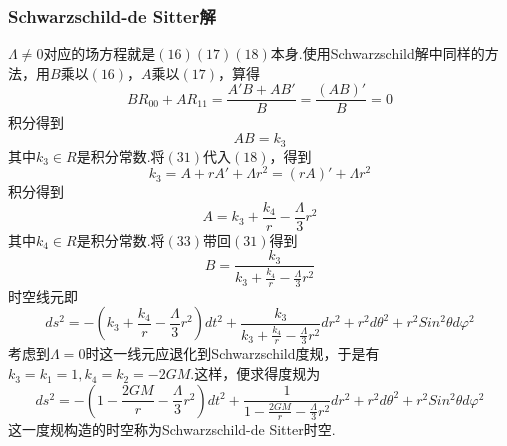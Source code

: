 	
	
	\subsubsection{Schwarzschild-de Sitter解}
	
	
	
	$\Lambda\ne0$对应的场方程就是$(16)(17)(18)$本身.使用Schwarzschild解中同样的方法，用$B$乘以$(16)$，$A$乘以$(17)$，算得
	\begin{equation}
		  BR_{00}+AR_{11}=\frac{A'B+AB'}{B}=\frac{(AB)'}{B}=0
	\end{equation}
	积分得到
	\begin{equation}
		  AB=k_3
	\end{equation}
	其中$k_3\in R$是积分常数.将$(31)$代入$(18)$，得到
	\begin{equation}
		  k_3=A+rA'+\Lambda r^2=(rA)'+\Lambda r^2
	\end{equation}
	积分得到
	\begin{equation}
		  A=k_3+\frac{k_4}{r}-\frac{\Lambda}{3}r^2
	\end{equation}
	其中$k_4\in R$是积分常数.将$(33)$带回$(31)$得到
	\begin{equation}
		  B=\frac{k_3}{k_3+\frac{k_4}{r}-\frac{\Lambda}{3}r^2}
	\end{equation}
	时空线元即
	\begin{equation}
		  ds^2=-\left(k_3+\frac{k_4}{r}-\frac{\Lambda}{3}r^2\right)dt^2+\frac{k_3}{k_3+\frac{k_4}{r}-\frac{\Lambda}{3}r^2}dr^2+r^2d\theta^2+r^2Sin^2\theta d\varphi^2
	\end{equation}
	考虑到$\Lambda=0$时这一线元应退化到Schwarzschild度规，于是有$k_3=k_1=1,k_4=k_2=-2GM$.这样，便求得度规为
	\begin{equation}
		  ds^2=-\left(1-\frac{2GM}{r}-\frac{\Lambda}{3}r^2\right)dt^2+\frac{1}{1-\frac{2GM}{r}-\frac{\Lambda}{3}r^2}dr^2+r^2d\theta^2+r^2Sin^2\theta d\varphi^2
	\end{equation}
	这一度规构造的时空称为Schwarzschild-de Sitter时空.

		
	
\newpage